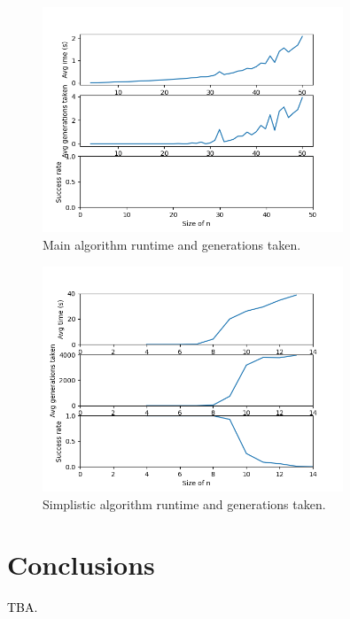 \documentclass{scrartcl}
\begin{document}
\begin{figure}[H]
    \centering
    \includegraphics[width=0.8\textwidth]{figure1.png}
    \caption{Main algorithm runtime and generations taken.}
    \label{fig:main}
\end{figure}

\begin{figure}[H]
    \centering
    \includegraphics[width=0.8\textwidth]{figure2.png}
    \caption{Simplistic algorithm runtime and generations taken.}
    \label{fig:simplistic}
\end{figure}

\section{Conclusions}
\label{sec:conclusions}

\textcolor{black}{TBA.}



\end{document}
